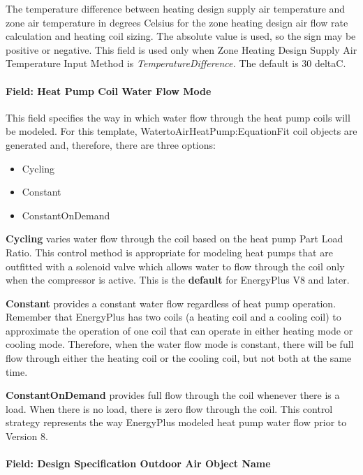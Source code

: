 The temperature difference between heating design supply air temperature and zone air temperature in degrees Celsius for the zone heating design air flow rate calculation and heating coil sizing. The absolute value is used, so the sign may be positive or negative. This field is used only when Zone Heating Design Supply Air Temperature Input Method is \emph{TemperatureDifference.} The default is 30 deltaC.

\paragraph{Field: Heat Pump Coil Water Flow Mode}\label{field-heat-pump-coil-water-flow-mode}

This field specifies the way in which water flow through the heat pump coils will be modeled. For this template, WatertoAirHeatPump:EquationFit coil objects are generated and, therefore, there are three options:

\begin{itemize}
\item
  Cycling
\item
  Constant
\item
  ConstantOnDemand
\end{itemize}

\textbf{Cycling} varies water flow through the coil based on the heat pump Part Load Ratio. This control method is appropriate for modeling heat pumps that are outfitted with a solenoid valve which allows water to flow through the coil only when the compressor is active. This is the \textbf{default} for EnergyPlus V8 and later.

\textbf{Constant} provides a constant water flow regardless of heat pump operation. Remember that EnergyPlus has two coils (a heating coil and a cooling coil) to approximate the operation of one coil that can operate in either heating mode or cooling mode. Therefore, when the water flow mode is constant, there will be full flow through either the heating coil or the cooling coil, but not both at the same time.

\textbf{ConstantOnDemand} provides full flow through the coil whenever there is a load. When there is no load, there is zero flow through the coil. This control strategy represents the way EnergyPlus modeled heat pump water flow prior to Version 8.

\paragraph{Field: Design Specification Outdoor Air Object Name}\label{field-design-specification-outdoor-air-object-name-5}


